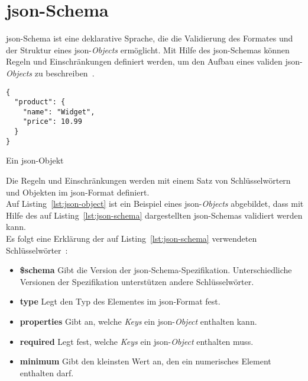 \section{\acs{json}-Schema}\label{sec:json-schema}

\acs{json}-Schema ist eine deklarative Sprache, die die Validierung des Formates und der Struktur eines \ac{json}-\textit{Objects} ermöglicht.
Mit Hilfe des \acs{json}-Schemas können Regeln und Einschränkungen definiert werden, um den Aufbau eines validen \ac{json}-\textit{Objects} zu beschreiben~\cite{json-schema-description}.

\begin{listing}[htp]
      \begin{verbatim}
{
  "product": {
    "name": "Widget",
    "price": 10.99
  }
}
      \end{verbatim}
      \caption{Ein \acs{json}-Objekt}
      \label{lst:json-object}
\end{listing}

Die Regeln und Einschränkungen werden mit einem Satz von Schlüsselwörtern und Objekten im \acs{json}-Format definiert.
\\
Auf Listing~\ref{lst:json-object} ist ein Beispiel eines \acs{json}-\textit{Objects} abgebildet, dass mit Hilfe des auf Listing~\ref{lst:json-schema}
dargestellten \acs{json}-Schemas validiert werden kann.
\\
Es folgt eine Erklärung der auf Listing~\ref{lst:json-schema} verwendeten Schlüsselwörter~\cite{json-schema-creation}:

\begin{itemize}
      \setlength\itemsep{-0.5cm}
      \item
            \textbf{\$schema} Gibt die Version der \acs{json}-Schema-Spezifikation. Unterschiedliche Versionen der Spezifikation
            unterstützen andere Schlüsselwörter.
      \item
            \textbf{type} Legt den Typ des Elementes im \acs{json}-Format fest.
      \item
            \textbf{properties} Gibt an, welche \textit{Keys} ein \acs{json}-\textit{Object} enthalten kann.
      \item
            \textbf{required} Legt fest, welche \textit{Keys} ein \acs{json}-\textit{Object}  enthalten muss.
      \item
            \textbf{minimum} Gibt den kleinsten Wert an, den ein numerisches Element enthalten darf.
\end{itemize}

